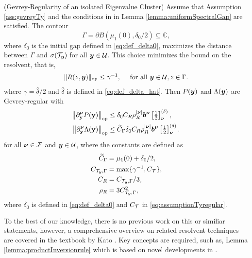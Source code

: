 \begin{theorem}(Gevrey-Regularity of an isolated Eigenvalue Cluster)\label{theorem:ClusterRegularity}
    Assume that Assumption \ref{ass:gevreyTy} and the conditions in  in Lemma \ref{lemma:uniformSpectralGap} are satisfied. 
    The contour
    \begin{equation}\label{eq:contourDef}
    \Gamma = \partial B( \mu_1(0), \delta_0/2) \subseteq \mathbb{C},
\end{equation} where $\delta_0 $ is the initial gap defined in \eqref{eq:def_delta0}, maximizes the distance between $\Gamma$ and $\sigma(\mathcal{T}_{\boldsymbol{y}}) $ for all ${\boldsymbol{y}} \in \mathcal{U}$. This choice minimizes the bound on the resolvent, that is, 
\begin{align}\label{eq:resolventUniformbound}
    \| R(z,{\boldsymbol{y}}) \|_{\mathrm{op}} \leq \gamma^{-1}, \quad \text{ for all } {\boldsymbol{y}} \in \mathcal{U}, z \in \Gamma.
\end{align}
where $\gamma = \hat \delta /2 $ and $\hat \delta $ is defined in \eqref{eq:def_delta_hat}. Then $P({\boldsymbol{y}})$ and $\Lambda({\boldsymbol{y}})$ 
    are Gevrey-regular with
    \begin{align*}
		{\left\| \partial_{{\mathbf{y}}}^{{\boldsymbol{\nu}}} P({\mathbf{y}}) \right\|_{\mathrm{op}}}
		&\leq \delta_0 C_R \rho_R^{\vert {\boldsymbol{\nu}} \vert} {\boldsymbol{b}}^{{\boldsymbol{\nu}}} \left[\tfrac{1}{2} \right]^{(\delta)}_{{\boldsymbol{\nu}}}, \\
  {\left\| \partial_{{\mathbf{y}}}^{{\boldsymbol{\nu}}} \Lambda({\mathbf{y}}) \right\|_{\mathrm{op}}}
		&\leq \widetilde C_\Gamma  \delta_0 C_R \rho_R^{{\left|{\boldsymbol{\nu}}\right|}} {\boldsymbol{b}}^{\boldsymbol{\nu}} \left[\tfrac{1}{2} \right]^{(\delta)}_{{\boldsymbol{\nu}}}.
	\end{align*}
    for all ${\boldsymbol{\nu}} \in \mathcal{F}$ and ${\boldsymbol{y}} \in \mathcal{U}$, where the constants are defined as
    \begin{align} 
       \widetilde C_\Gamma &= \mu_1(0) + \delta_0/2, \\
         C_{\mathcal{T}_{\boldsymbol{y}},\Gamma}&=   \max \{ \gamma^{-1}, C_{\mathcal{T}} \}, \label{eq:CcalTGamma} \\
   C_R &= C_{\mathcal{T}_{\boldsymbol{y}},\Gamma}/3,  \label{eq:C_R}\\
   \rho_R &= 3  C_{\mathcal{T}_{\boldsymbol{y}},\Gamma}^2   \label{eq:rho_R} , 
    \end{align}
    where $\delta_0$ is defined in \eqref{eq:def_delta0} and $C_{\mathcal{T}} $ in \eqref{eq:assumptionTyregular}.
\end{theorem}
To the best of our knowledge, there is no previous work on this or similiar statements, however, a comprehensive overview on related resolvent techniques are covered in the textbook by Kato \cite{kato1995perturbation}. Key concepts are required, such as, Lemma \ref{lemma:productInversionrule} which is based on novel developments in \cite{chernov2026gevreyclassregularitysteadystate}.
